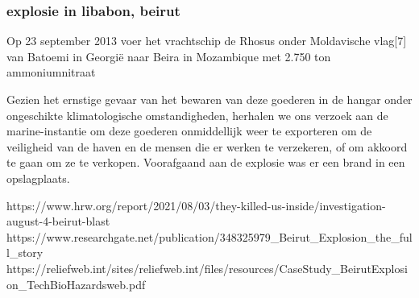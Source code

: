 


\subsubsection{explosie in libabon, beirut 
}

Op 23 september 2013 voer het vrachtschip de Rhosus onder Moldavische vlag[7] van Batoemi in Georgië naar Beira in Mozambique met 2.750 ton ammoniumnitraat

Gezien het ernstige gevaar van het bewaren van deze goederen in de hangar onder ongeschikte klimatologische omstandigheden, herhalen we ons verzoek aan de marine-instantie om deze goederen onmiddellijk weer te exporteren om de veiligheid van de haven en de mensen die er werken te verzekeren, of om akkoord te gaan om ze te verkopen.
Voorafgaand aan de explosie was er een brand in een opslagplaats. 

https://www.hrw.org/report/2021/08/03/they-killed-us-inside/investigation-august-4-beirut-blast 
https://www.researchgate.net/publication/348325979_Beirut_Explosion_the_full_story 
https://reliefweb.int/sites/reliefweb.int/files/resources/CaseStudy_BeirutExplosion_TechBioHazardsweb.pdf 